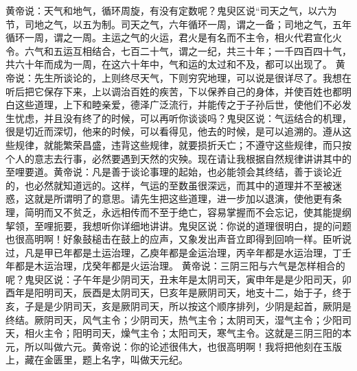 \documentclass[a4paper,12pt,UTF8,twoside]{ctexbook}
\begin{document}
黄帝说：天气和地气，循环周旋，有没有定数呢？鬼臾区说“司天之气，以六为节，司地之气，以五为制。司天之气，六年循环一周，谓之一备；司地之气，五年循环一周，谓之一周。主运之气的火运，君火是有名而不主令，相火代君宣化火令。六气和五运互相结合，七百二十气，谓之一纪，共三十年；一千四百四十气，共六十年而成为一周，在这六十年中，气和运的太过和不及，都可以出现了。
黄帝说：先生所谈论的，上则终尽天气，下则穷究地理，可以说是很详尽了。我想在听后把它保存下来，上以调治百姓的疾苦，下以保养自己的身体，并使百姓也都明白这些道理，上下和睦亲爱，德泽广泛流行，并能传之于子孙后世，使他们不必发生忧虑，并且没有终了的时候，可以再听你谈谈吗？鬼臾区说：气运结合的机理，很是切近而深切，他来的时候，可以看得见，他去的时候，是可以追溯的。遵从这些规律，就能繁荣昌盛，违背这些规律，就要损折夭亡；不遵守这些规律，而只按个人的意志去行事，必然要遇到天然的灾殃。现在请让我根据自然规律讲讲其中的至哩要道。黄帝说：凡是善于谈论事理的起始，也必能领会其终结，善于谈论近的，也必然就知道远的。这样，气运的至数虽很深远，而其中的道理并不至被迷惑，这就是所谓明了的意思。请先生把这些道理，进一步加以退演，使他更有条理，简明而又不贫乏，永远相传而不至于绝亡，容易掌握而不会忘记，使其能提纲挈领，至哩扼要，我想听你详细地讲讲。鬼臾区说：你说的道理很明白，提的问题也很高明啊！好象鼓槌击在鼓上的应声，又象发出声音立即得到回响一样。臣听说过，凡是甲已年都是土运治理，乙庾年都是金运治理，丙辛年都是水运治理，丁壬年都是木运治理，戊癸年都是火运治理。
黄帝说：三阴三阳与六气是怎样相合的呢？鬼臾区说：子午年是少阴司天，丑末年是太阴司天，寅申年是是少阳司天，卯酉年是阳明司天，辰酉是太阴司天，巳亥年是厥阴司天，地支十二，始于子，终于亥，子是是少阴司天，亥是厥阴司天，所以按这个顺序排列，少阴是起首，厥阴是终结。厥阴司天，风气主令；少阴司天，热气主令；太阴司天，湿气主令；少阳司天，相火主令；阳明司天，燥气主令；太阳司天，寒气主令。这就是三阴三阳的本元，所以叫做六元。黄帝说：你的论述很伟大，也很高明啊！我将把他刻在玉版上，藏在金匮里，题上名字，叫做天元纪。
\end{document}
